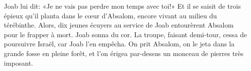Joab lui dit: «Je ne vais pas perdre mon temps avec toi!»
Et il se saisit de trois épieux qu’il planta dans le cœur d’Absalom,
	encore vivant au milieu du térébinthe.
Alors, dix jeunes écuyers au service de Joab entourèrent Absalom pour le frapper à mort.
Joab sonna du cor.
	La troupe, faisant demi-tour, cessa de poursuivre Israël, car Joab l’en empêcha.
On prit Absalom, on le jeta dans la grande fosse en pleine forêt,
	et l’on érigea par-dessus un monceau de pierres très imposant.
